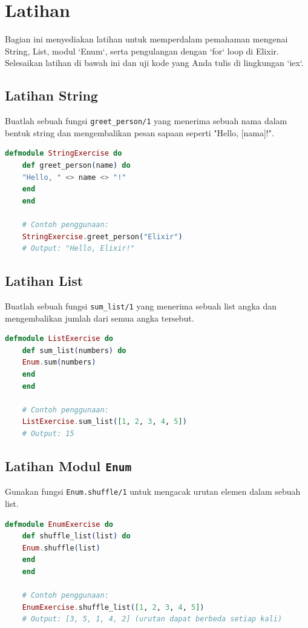 \section{Latihan}

Bagian ini menyediakan latihan untuk memperdalam pemahaman mengenai String, List, modul `Enum`, serta pengulangan dengan `for` loop di Elixir. Selesaikan latihan di bawah ini dan uji kode yang Anda tulis di lingkungan `iex`.

\subsection{Latihan String}

Buatlah sebuah fungsi \texttt{greet\_person/1} yang menerima sebuah nama dalam bentuk string dan mengembalikan pesan sapaan seperti "Hello, [nama]!".

\begin{lstlisting}[language=Elixir]
	defmodule StringExercise do
	def greet_person(name) do
	"Hello, " <> name <> "!"
	end
	end
	
	# Contoh penggunaan:
	StringExercise.greet_person("Elixir")
	# Output: "Hello, Elixir!"
\end{lstlisting}

\subsection{Latihan List}

Buatlah sebuah fungsi \texttt{sum\_list/1} yang menerima sebuah list angka dan mengembalikan jumlah dari semua angka tersebut.

\begin{lstlisting}[language=Elixir]
	defmodule ListExercise do
	def sum_list(numbers) do
	Enum.sum(numbers)
	end
	end
	
	# Contoh penggunaan:
	ListExercise.sum_list([1, 2, 3, 4, 5])
	# Output: 15
\end{lstlisting}

\subsection{Latihan Modul \texttt{Enum}}

Gunakan fungsi \texttt{Enum.shuffle/1} untuk mengacak urutan elemen dalam sebuah list.

\begin{lstlisting}[language=Elixir]
	defmodule EnumExercise do
	def shuffle_list(list) do
	Enum.shuffle(list)
	end
	end
	
	# Contoh penggunaan:
	EnumExercise.shuffle_list([1, 2, 3, 4, 5])
	# Output: [3, 5, 1, 4, 2] (urutan dapat berbeda setiap kali)
\end{lstlisting}

